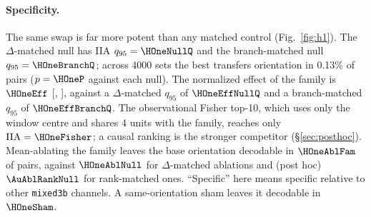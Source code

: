 \documentclass[11pt]{article}
\newcommand{\iia}{\mathrm{IIA}}
\begin{document}
\paragraph{Specificity.}
The same swap is far more potent than any matched control (Fig.~\ref{fig:h1}). The $\Delta$-matched null has IIA $q_{95}=\HOneNullQ$ and the branch-matched null $q_{95}=\HOneBranchQ$; across 4000 sets the best transfers orientation in 0.13\% of pairs ($p=\HOneP$ against each null). The normalized effect of the family is $\HOneEff$ [\HOneEffLo, \HOneEffHi], against a $\Delta$-matched $q_{95}$ of $\HOneEffNullQ$ and a branch-matched $q_{95}$ of $\HOneEffBranchQ$. The observational Fisher top-10, which uses only the window centre and shares 4 units with the family, reaches only $\iia=\HOneFisher$; a causal ranking is the stronger competitor (\S\ref{sec:posthoc}). Mean-ablating the family leaves the base orientation decodable in $\HOneAblFam$ of pairs, against $\HOneAblNull$ for $\Delta$-matched ablations and (post hoc) $\AuAblRankNull$ for rank-matched ones. ``Specific'' here means specific relative to other \texttt{mixed3b} channels. A same-orientation sham leaves it decodable in $\HOneSham$.
\end{document}
